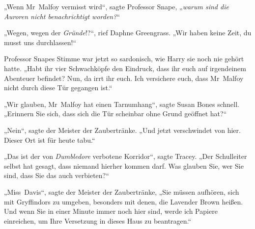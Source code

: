 „Wenn Mr~Malfoy vermisst wird“, sagte Professor Snape,
„\emph{warum sind die Auroren nicht benachrichtigt worden?}“

„Wegen, wegen der \emph{Gründe}!?“, rief Daphne Greengrass.
„Wir haben keine Zeit, du musst uns durchlassen!“

Professor Snapes Stimme war jetzt so sardonisch, wie Harry sie noch nie gehört hatte.
„Habt ihr vier Schwachköpfe den Eindruck, dass ihr euch auf irgendeinem Abenteuer befindet? Nun, da irrt ihr euch. Ich versichere euch, dass Mr~Malfoy nicht durch diese Tür gegangen ist.“

„Wir glauben, Mr~Malfoy hat einen Tarnumhang“, sagte Susan Bones schnell.
„Erinnern Sie sich, dass sich die Tür scheinbar ohne Grund geöffnet hat?“

„Nein“, sagte der Meister der Zaubertränke.
„Und jetzt verschwindet von hier. Dieser Ort ist für heute tabu.“

„Das ist der von \emph{Dumbledore} verbotene Korridor“, sagte Tracey.
„Der Schulleiter selbst hat gesagt, dass niemand hierher kommen darf. Was glauben Sie, wer Sie sind, dass Sie das auch verbieten?“

„Miss~Davis“, sagte der Meister der Zaubertränke,
„Sie müssen aufhören, sich mit Gryffindors zu umgeben, besonders mit denen, die Lavender Brown heißen. Und wenn Sie in einer Minute immer noch hier sind, werde ich Papiere einreichen, um Ihre Versetzung in dieses Haus zu beantragen.“

